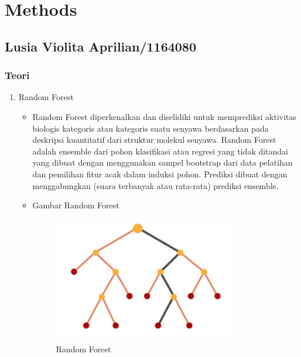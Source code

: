 \chapter{Methods}

\section{Lusia Violita Aprilian/1164080}
\subsection{Teori}
\begin{enumerate}
\item Random Forest
	\begin{itemize}
	\item Random Forest diperkenalkan dan diselidiki untuk memprediksi aktivitas biologis kategoris atau kategoris suatu senyawa berdasarkan pada deskripsi kuantitatif dari struktur molekul senyawa. Random Forest adalah ensemble dari pohon klasifikasi atau regresi yang tidak ditandai yang dibuat dengan menggunakan sampel bootstrap dari data pelatihan dan pemilihan fitur acak dalam induksi pohon. Prediksi dibuat dengan menggabungkan (suara terbanyak atau rata-rata) prediksi ensemble.
	\item Gambar Random Forest
		\begin{figure}[ht]
		\centering
		\includegraphics[scale=0.5]{figures/j1.jpg}
		\caption{Random Forest}
		\label{contoh}
		\end{figure}
	\end{itemize}


\end{enumerate}
